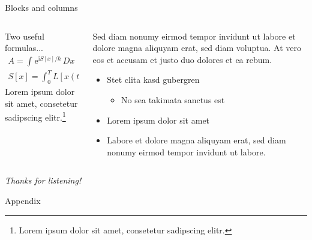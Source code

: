 \documentclass[compress,aspectratio=1610]{beamer}
\begin{document}
\begin{frame}{Blocks and columns}
  \begin{columns}
    \begin{column}{0.5\textwidth}
      \begin{block}{Two useful formulas...}
        \begin{gather*}
          A = \int^{}\mathrm{e}^{\mathrm{i} S[x] / \hbar}\,Dx \\
          S[x] = \int^{T}_0 L[x(t)]\,\mathrm{d}t
        \end{gather*}
      Lorem ipsum dolor sit amet, consetetur sadipscing elitr.\footnote[frame]{Lorem ipsum dolor sit amet, consetetur sadipscing elitr.}
      \end{block}
    \end{column}
    \begin{column}{0.5\textwidth}
      Sed diam nonumy eirmod tempor invidunt ut labore et dolore magna aliquyam erat, sed diam voluptua. At vero eos et accusam et justo duo dolores et ea rebum.

      \begin{itemize}
        \item Stet clita kasd gubergren
          \begin{itemize}
            \item No sea takimata sanctus est
          \end{itemize}
        \item Lorem ipsum dolor sit amet
        \item Labore et dolore magna aliquyam erat, sed diam nonumy eirmod tempor invidunt ut labore.
      \end{itemize}
    \end{column}
  \end{columns}
\end{frame}

\begin{darkframe}[noframenumbering]
  \centering
  \textit{Thanks for listening!}
\end{darkframe}

\appendix
\begin{darkframe}
  \centering
   Appendix
\end{darkframe}
\end{document}
